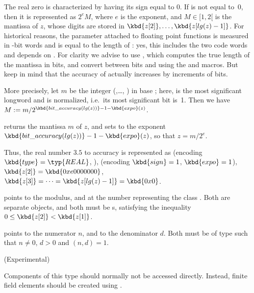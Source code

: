 The real zero is characterized by having its sign equal to 0. If  is
not equal to~0, then it is represented as $2^e M$, where $e$ is the exponent,
and $M\in [1, 2[$ is the mantissa of $z$, whose digits are stored in
$\kbd{z[2]},\dots, \kbd{z[lg(z)-1]}$. For historical reasons, the 
parameter attached to floating point functions is measured in \B-bit words
and is equal to the length of : yes, this includes the two code words
and depends on . For clarity we advise to use
, which computes the true length of the mantissa in bits,
and convert between bits and  using the  and
 macros. But keep in mind that the accuracy of 
actually increases by increments of \B bits.

More precisely, let $m$ be the integer (,\dots, )
in base ; here,  is the most significant
longword and is normalized, i.e.~its most significant bit is~1. Then we have
$M := m / 2^{\kbd{bit\_accuracy(lg(z))} - 1 - \kbd{expo}(z)}$.

 returns the mantissa $m$ of $z$, and
sets  to the exponent $\kbd{bit\_accuracy(lg(z))}-1-\kbd{expo}(z)$,
so that $z = m / 2^e$.

Thus, the real number $3.5$ to accuracy  is
represented as  (encoding $\kbd{type} = \typ{REAL}$, ),
 (encoding $\kbd{sign} = 1$, $\kbd{expo} = 1$), $\kbd{z[2]} =
\kbd{0xe0000000}$, $\kbd{z[3]} =\dots = \kbd{z[lg(z)-1]} = \kbd{0x0}$.

 points to the modulus, and  at the number representing
the class . Both are separate  objects, and both must be
s, satisfying the inequality $0 \le \kbd{z[2]} < \kbd{z[1]}$.

%
 points to the numerator $n$, and  to the denominator
$d$. Both must be of type  such that $n\neq 0$, $d > 0$ and
$(n,d) = 1$.

%
 (Experimental)

Components of this type should normally not be accessed directly. Instead,
finite field elements should be created using .

